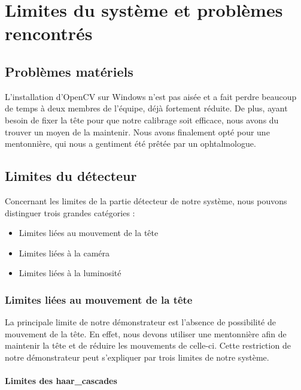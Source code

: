 \section{Limites du système et problèmes rencontrés}

\subsection{Problèmes matériels}
L'installation d'OpenCV sur Windows n'est pas aisée et a fait perdre beaucoup de temps à deux membres de l'équipe, déjà fortement réduite.
De plus, ayant besoin de fixer la tête pour que notre calibrage soit efficace, nous avons du trouver un moyen de la maintenir. Nous avons finalement opté pour une mentonnière, qui nous a gentiment été prêtée par un ophtalmologue.

\subsection{Limites du détecteur}

Concernant les limites de la partie détecteur de notre système, nous pouvons distinguer trois grandes catégories :
\begin{itemize}[font=\tiny, label=]
\item Limites liées au mouvement de la tête
\item Limites liées à la caméra
\item Limites liées à la luminosité
\end{itemize}

\subsubsection{Limites liées au mouvement de la tête}

La principale limite de notre démonstrateur est l’absence de possibilité de mouvement de la tête. En effet, nous devons utiliser une mentonnière afin de maintenir la tête et de réduire les mouvements de celle-ci. Cette restriction de notre démonstrateur peut s’expliquer par trois limites de notre système.

\paragraph{Limites des haar\_cascades}

